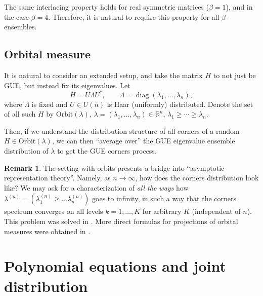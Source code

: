 \documentclass[letterpaper,11pt,oneside,reqno]{article}
\numberwithin{equation}{section}
\theoremstyle{definition}
\newtheorem{remark}[proposition]{Remark}
\begin{document}
The same interlacing property holds for real symmetric matrices ($\beta=1$),
and in the case $\beta=4$.
Therefore, it is natural to require this property for all $\beta$-ensembles.

\subsection{Orbital measure}

It is natural to consider an extended setup, and
take the matrix $H$ to not just be GUE, but instead fix its eigenvalues.
Let
\begin{equation*}
	H=U\Lambda U^\dagger,\qquad \Lambda=\operatorname{diag}(\lambda_1,\dots,\lambda_n),
\end{equation*}
where $\Lambda$ is fixed and $U\in U(n)$ is Haar (uniformly) distributed.
Denote the set of all such $H$
by $\mathrm{Orbit}(\lambda)$, $\lambda=(\lambda_1,\dots,\lambda_n)\in \mathbb{R}^n$,
$\lambda_1\ge \cdots\ge \lambda_n$.

Then, if we understand the distribution structure
of all corners of a random $H\in \mathrm{Orbit}(\lambda)$,
we can then ``average over'' the GUE eigenvalue ensemble distribution of $\lambda$
to get the GUE corners process.

\begin{remark}
	The setting with orbits presents a bridge into ``asymptotic representation theory''.
	Namely, as $n\to\infty$, how does the corners distribution look like?
	We may ask for a characterization of \emph{all the ways} how
	$\lambda^{(n)}=( \lambda_1^{(n)}\ge \ldots \lambda^{(n)}_n  )$
	goes to infinity, in such a way that the corners
	spectrum converges on all levels $k=1,\ldots,K $ for arbitrary $K$ (independent of
	$n$).
	This problem was solved in \cite{OlVer1996}.
	More direct formulas for projections of orbital measures
	were obtained in \cite{olshanski2013projections}.
\end{remark}


\section{Polynomial equations and joint distribution}
\end{document}
